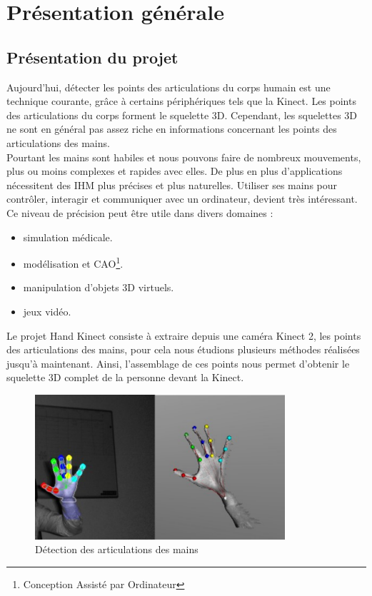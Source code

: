 \chapter{Présentation générale}



\section{Présentation du projet}
Aujourd'hui, détecter les points des articulations du corps humain 
est une technique courante, grâce à certains périphériques tels que la 
Kinect. Les points des articulations du corps forment le squelette 3D. 
Cependant, les squelettes 3D ne sont en général pas assez riche en 
informations concernant les points des articulations des mains.\\

Pourtant les mains sont habiles et nous pouvons faire de nombreux 
mouvements, plus ou moins complexes et rapides avec elles. De plus en 
plus d'applications nécessitent des IHM plus précises et plus 
naturelles. Utiliser ses mains pour contrôler, interagir et communiquer 
avec un ordinateur, devient très intéressant. Ce niveau de 
précision peut être utile dans divers domaines :
\begin{itemize}
  \item simulation médicale.
  \item modélisation et CAO\footnote{Conception Assisté par Ordinateur}.
  \item manipulation d'objets 3D virtuels.
  \item jeux vidéo.\\
\end{itemize}

Le projet \og Hand Kinect \fg consiste à extraire depuis une caméra Kinect 2, 
les points des articulations des mains, pour cela nous étudions plusieurs 
méthodes réalisées jusqu'à maintenant. Ainsi, l'assemblage de ces points 
nous permet d'obtenir le squelette 3D complet de la personne devant la 
Kinect.\\

\begin{figure}[H]
  \begin{center}
    \includegraphics[width=350px]{images/joint_detection.png}
    \caption{Détection des articulations des mains}
  \end{center}
\end{figure}

